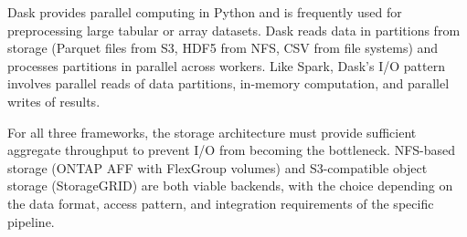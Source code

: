 Dask provides parallel computing in Python and is frequently used for
preprocessing large tabular or array datasets. Dask reads data in partitions
from storage (Parquet files from S3, HDF5 from NFS, CSV from file systems)
and processes partitions in parallel across workers. Like Spark, Dask's I/O
pattern involves parallel reads of data partitions, in-memory computation, and
parallel writes of results.

For all three frameworks, the storage architecture must provide sufficient
aggregate throughput to prevent I/O from becoming the bottleneck. NFS-based
storage (ONTAP AFF with FlexGroup volumes) and S3-compatible object storage
(StorageGRID) are both viable backends, with the choice depending on the data
format, access pattern, and integration requirements of the specific pipeline.


